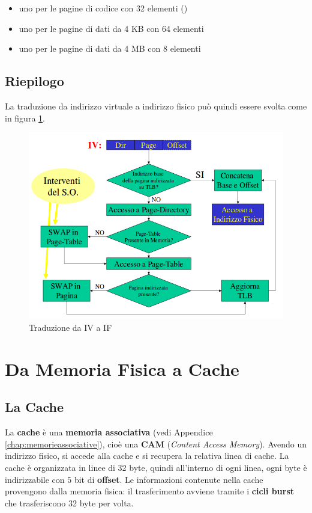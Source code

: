 \documentclass[11pt]{book}
\begin{document}
\begin{itemize}
\item uno per le pagine di codice con 32 elementi ()
\item uno per le pagine di dati da 4 KB con 64 elementi
\item uno per le pagine di dati da 4 MB con 8 elementi
\end{itemize}

\subsection{Riepilogo}

La traduzione da indirizzo virtuale a indirizzo fisico pu\`o quindi
essere svolta come in figura \ref{ivif}.

\begin{figure}[h]
  \centering
  \includegraphics[width=.9\textwidth]{images/ivif.png}
  \caption{Traduzione da IV a IF}
  \label{ivif}
\end{figure}

\section{Da Memoria Fisica a Cache}

\subsection{La Cache}

La {\bf cache} \`e una {\bf memoria associativa} (vedi Appendice
\ref{chap:memorieassociative}), cio\`e una {\bf CAM} ({\em Content
  Access Memory}). Avendo un indirizzo fisico, si accede alla cache e
si recupera la relativa linea di cache. La cache \`e organizzata in
linee di 32 byte, quindi all'interno di ogni linea, ogni byte \`e
indirizzabile con $5$ bit di {\bf offset}. Le informazioni contenute
nella cache provengono dalla memoria fisica: il trasferimento avviene
tramite i {\bf cicli burst} che trasferiscono 32 byte per volta.
\end{document}

